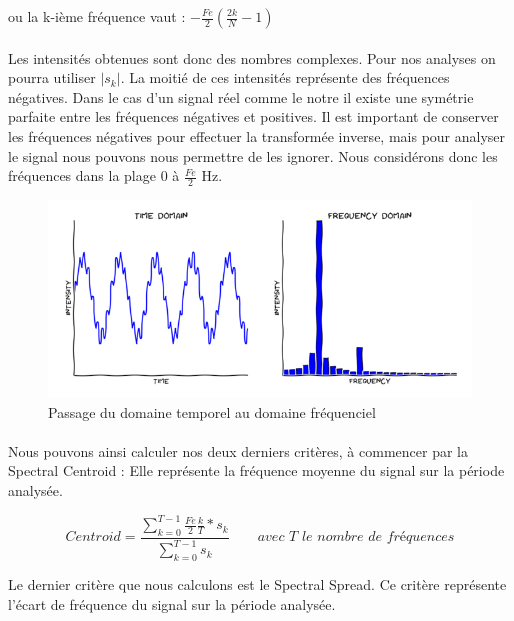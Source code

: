 \documentclass[soumission]{ir}
\begin{document}
ou la k-ième fréquence vaut : $-\frac{Fe}{2} (\frac{2k}{N} - 1)$

\paragraph{}
Les intensités obtenues sont donc des nombres complexes. Pour nos analyses on pourra utiliser $|s_k|$. La 
moitié de ces intensités représente des fréquences négatives. Dans le cas d'un signal réel comme le notre 
il existe une symétrie parfaite entre les fréquences négatives et positives. Il est important de conserver 
les fréquences négatives pour effectuer la transformée inverse, mais pour analyser le signal nous pouvons 
nous permettre de les ignorer. Nous considérons donc les fréquences dans la plage 0 à $\frac{Fe}{2}$ Hz.

\begin{figure}[ht]
    \centering
    \includegraphics[scale=0.7]{images/Fourier.png}
    \caption{Passage du domaine temporel au domaine fréquenciel}
    \label{ex_Fourier}
\end{figure}

\paragraph{}
Nous pouvons ainsi calculer nos deux derniers critères, à commencer par la Spectral Centroid : Elle représente la 
fréquence moyenne du signal sur la période analysée.

\begin{equation}
    Centroid = \frac{ \sum_{k = 0}^{T-1} \frac{Fe}{2} \frac{k}{T} * s_k}{\sum_{k=0}^{T-1} s_k}
    \qquad \textit{avec T le nombre de fréquences}
\end{equation}

Le dernier critère que nous calculons est le Spectral Spread. Ce critère représente l'écart de fréquence du
signal sur la période analysée.
\end{document}
